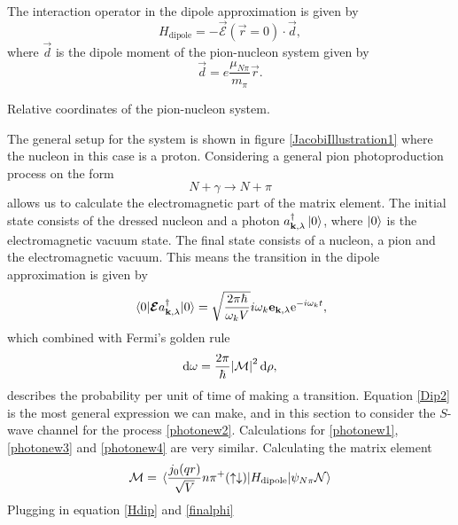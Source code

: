 The interaction operator in the dipole approximation is given by
\begin{equation}\label{Dip}
	H_\text{dipole} = -\vec{\mathcal{E}}(\vec{r}=0)\cdot \vec{d},
\end{equation}
where $\vec{d}$ is the dipole moment of the pion-nucleon system given by 
\begin{equation}\label{dipolemoment}
	\vec{d}=e\frac{\mu_{N\pi}}{m_\pi}\vec{r}.
\end{equation}
\begin{marginfigure}
	\centering
	
	\caption{Relative coordinates of the pion-nucleon system.}
	\label{JacobiIllustration1}
\end{marginfigure}
The general setup for the system is shown in figure \ref{JacobiIllustration1} where the nucleon in this case is a proton. Considering a general pion photoproduction process on the form
\begin{equation}\label{General}
	N+\gamma \rightarrow N+\pi
\end{equation}
allows us to calculate the electromagnetic part of the matrix element. The initial state consists of the dressed nucleon and a photon $a_{\bm{\mathrm{k}},\lambda}^\dagger \ket{0}$, where $\ket{0}$ is the electromagnetic vacuum state. The final state consists of a nucleon, a pion and the electromagnetic vacuum. This means the transition in the dipole approximation is given by 
\begin{equation}\label{Dip2}
	\mel{0}{\bm{\mathrm{\mathcal{E}}}a_{\bm{\mathrm{k}},\lambda}^\dagger}{0} = \sqrt{\frac{2\pi\hbar}{\omega_k V}}i\omega_k \bm{\mathrm{e}}_{\bm{\mathrm{k}},\lambda}\text{e}^{-i\omega_k t},
\end{equation}
which combined with Fermi's golden rule
\begin{equation}\label{FermiGoldenRule}
	\text{d}\omega = \frac{2\pi}{\hbar}\abs{\mathcal{M}}^2 \text{d}\rho,
\end{equation}
describes the probability per unit of time of making a transition. Equation \eqref{Dip2} is the most general expression we can make, and in this section to consider the $S$-wave channel for the process \eqref{photonew2}. Calculations for \eqref{photonew1}, \eqref{photonew3} and \eqref{photonew4} are very similar. Calculating the matrix element
\begin{equation}\label{Hdip}
	\mathcal{M}=\mel*{\frac{j_0(qr)}{\sqrt{V}}n\pi^+(\uparrow\downarrow)}{H_\text{dipole}}{\psi_{N\pi}\mathcal{N}}
\end{equation}
Plugging in equation \eqref{Hdip} and \eqref{finalphi}
